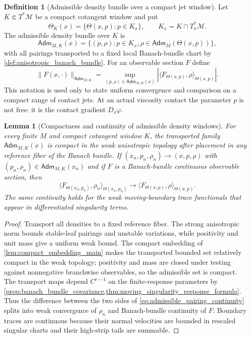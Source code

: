 \documentclass[12pt, letterpaper]{amsart}
\newcommand{\Mcal}{\mathcal{M}}
\newcommand{\Thetacal}{\Theta}
\newcommand{\Adm}{\mathsf{Adm}}
\theoremstyle{plain}
\newtheorem{lemma}[theorem]{Lemma}
\theoremstyle{definition}
\newtheorem{definition}[theorem]{Definition}
\theoremstyle{remark}
\begin{document}
\begin{definition}[Admissible density bundle over a compact jet window]
\label{def:admissible_density_window}
Let $K\Subset T^*\Mcal$ be a compact cotangent window and put
\begin{equation}
    \Thetacal_K(x)=\{\Theta(x,p):p\in K_x\},
    \qquad K_x=K\cap T_x^*\Mcal .
\end{equation}
The admissible density bundle over $K$ is
\begin{equation}
    \Adm_{M,K}(x)=
    \{(p,\rho):p\in K_x,
       \rho\in\Adm_M(\Theta(x,p))\},
\end{equation}
with all pairings transported to a fixed local Banach-bundle chart by
\cref{def:anisotropic_banach_bundle}.  For an observable section $F$ define
\begin{equation}
    \|F(x,\cdot)\|_{\Adm_{M,K}}
       =\sup_{(p,\rho)\in\Adm_{M,K}(x)}
          |\langle F_{\Theta(x,p)},\rho\rangle_{\Theta(x,p)}|.
\end{equation}
This notation is used only to state uniform convergence and comparison on a
compact range of contact jets.  At an actual viscosity contact the parameter
$p$ is not free: it is the contact gradient $D_x\varphi$.
\end{definition}

\begin{lemma}[Compactness and continuity of admissible density windows]
\label{lem:admissible_density_compactness}
For every finite $M$ and compact cotangent window $K$, the transported family
$\Adm_{M,K}(x)$ is compact in the weak anisotropic topology after placement in
any reference fiber of the Banach bundle.  If
$(x_n,p_n,\rho_n)\to(x,p,\rho)$ with
$(p_n,\rho_n)\in\Adm_{M,K}(x_n)$ and if $F$ is a Banach-bundle continuous
observable section, then
\begin{equation}
\label{eq:admissible_pairing_continuity}
    \langle F_{\Theta(x_n,p_n)},\rho_n\rangle_{\Theta(x_n,p_n)}
    \longrightarrow
    \langle F_{\Theta(x,p)},\rho\rangle_{\Theta(x,p)} .
\end{equation}
The same continuity holds for the weak moving-boundary trace functionals that
appear in differentiated singularity terms.
\end{lemma}

\begin{proof}
Transport all densities to a fixed reference fiber.  The strong anisotropic norm
bounds stable-leaf pairings and unstable variations, while positivity and unit
mass give a uniform weak bound.  The compact embedding of
\cref{lem:compact_embedding_main} makes the transported bounded set relatively
compact in the weak topology; positivity and mass are closed under testing
against nonnegative branchwise observables, so the admissible set is compact.
The transport maps depend $C^{r-4}$ on the finite-response parameters by
\cref{prop:banach_bundle_covariance,thm:moving_singularity_response_formula}.
Thus the difference between the two sides of
\eqref{eq:admissible_pairing_continuity} splits into weak convergence of
$\rho_n$ and Banach-bundle continuity of $F$.  Boundary traces are continuous
because their normal velocities are bounded in rescaled singular charts and
their high-strip tails are summable.
\end{proof}
\end{document}
